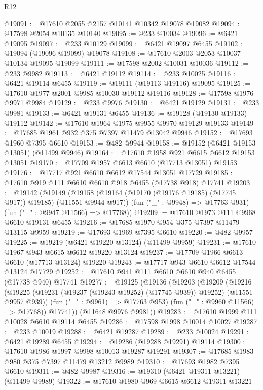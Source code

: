 \begin{lexlean}{R12}
\begin{coremodule}
{{{{{{{{{{{{{{{{{{{{{{{{{{{{{{{{{{{{{{{{{{{{{{{{{{{{{{{{{{{{{{{{{{{{{{{{{{{{{{{{{{@19091 := @17610 @2055 @2157 @10141 @10342 @19078 @19082
@19094 := @17598 @2054 @10135 @10140
@19095 := @233 @10034
@19096 := @6421 @19095
@19097 := @233 @10129
@19099 := @6421 @19097 @6455
@19102 := @19094 (@19096 @19099) @19078
@19108 := @17610 @2003 @2053 @10037 @10134 @19095 @19099
@19111 := @17598 @2002 @10031 @10036
@19112 := @233 @9982
@19113 := @6421 @19112
@19114 := @233 @10025
@19116 := @6421 @19114 @6455
@19119 := @19111 (@19113 @19116) @19095
@19125 := @17610 @1977 @2001 @9985 @10030 @19112 @19116
@19128 := @17598 @1976 @9971 @9984
@19129 := @233 @9976
@19130 := @6421 @19129
@19131 := @233 @9981
@19133 := @6421 @19131 @6455
@19136 := @19128 (@19130 @19133) @19112
@19142 := @17610 @1964 @1975 @9955 @9970 @19129 @19133
@19149 := @17685 @1961 @932 @375 @7397 @11479 @13042 @9946
@19152 := @17693 @1960 @7395 @6610
@19153 := @482 @9944
@19158 := @19152 (@6421 @19153 @13051) (@11499 @9946)
@19164 := @17610 @1958 @921 @6615 @6612 @19153 @13051
@19170 := @17709 @1957 @6613 @6610 (@17713 @13051) @19153
@19176 := @17717 @921 @6610 @6612 @17544 @13051 @17729
@19185 := @17610 @919 @111 @6610 @6610 @918 @6455 (@17738 @918) @17741
@19203 := @19142
    (@19149
      (@19158 (@19164 (@19170 (@19176 @19185) (@17745 @917)) @19185) (@11551 @9944 @917))
      (fun ("_" : @9948) => @17763 @931)
      (fun ("_" : @9947 @11566) => @17768))
@19209 := @17610 @1973 @111 @9968 @6610 @19131 @6455
@19216 := @17685 @1970 @954 @375 @7397 @11479 @13115 @9959
@19219 := @17693 @1969 @7395 @6610
@19220 := @482 @9957
@19225 := @19219 (@6421 @19220 @13124) (@11499 @9959)
@19231 := @17610 @1967 @943 @6615 @6612 @19220 @13124
@19237 := @17709 @1966 @6613 @6610 (@17713 @13124) @19220
@19243 := @17717 @943 @6610 @6612 @17544 @13124 @17729
@19252 := @17610 @941 @111 @6610 @6610 @940 @6455 (@17738 @940) @17741
@19277 := @19125
    (@19136
      (@19203
        (@19209
          (@19216
            (@19225 (@19231 (@19237 (@19243 @19252) (@17745 @939)) @19252) (@11551 @9957 @939))
            (fun ("_" : @9961) => @17763 @953)
            (fun ("_" : @9960 @11566) => @17768))
          @17741))
      (@11648 @9976 @9981))
@19283 := @17610 @1999 @111 @10028 @6610 @19114 @6455
@19286 := @17598 @1998 @10014 @10027
@19287 := @233 @10019
@19288 := @6421 @19287
@19289 := @233 @10024
@19291 := @6421 @19289 @6455
@19294 := @19286 (@19288 @19291) @19114
@19300 := @17610 @1986 @1997 @9998 @10013 @19287 @19291
@19307 := @17685 @1983 @980 @375 @7397 @11479 @13212 @9989
@19310 := @17693 @1982 @7395 @6610
@19311 := @482 @9987
@19316 := @19310 (@6421 @19311 @13221) (@11499 @9989)
@19322 := @17610 @1980 @969 @6615 @6612 @19311 @13221
}}}}}}}}}}}}}}}}}}}}}}}}}}}}}}}}}}}}}}}}}}}}}}}}}}}}}}}}}}}}}}}}}}}}}}}}}}}}}}}}}}
\end{coremodule}
\end{lexlean}
